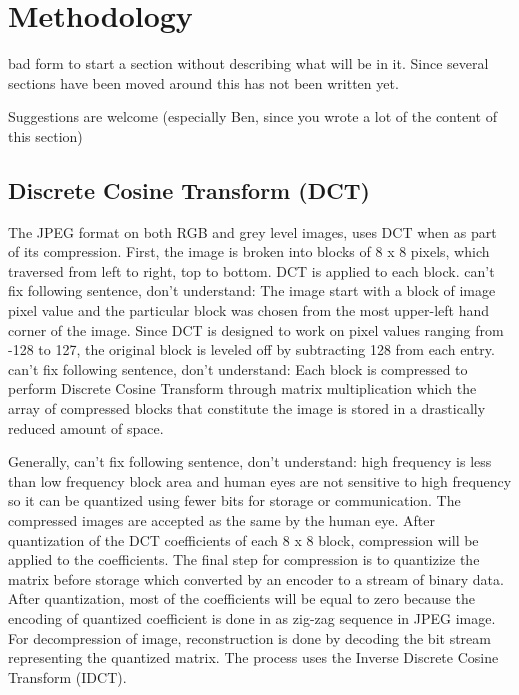 \section{Methodology}

{\color{red} bad form to start a section without describing what will be in it. Since several sections have been moved around this has not been written yet. 

Suggestions are welcome (especially Ben, since you wrote a lot of the content of this section)}

\subsection{Discrete Cosine Transform (DCT)}

The JPEG format on both RGB and grey level images, uses DCT when as part of its compression. 
First, the image is broken into blocks of 8 x 8 pixels, which traversed from left to right, top to bottom. DCT is applied to each block. 
{\color{red} can't fix following sentence, don't understand:} {\color{blue}The image start with a block of image pixel value and the particular block was chosen from the most upper-left hand corner of the image.}
Since DCT is designed to work on pixel values ranging from -128 to 127, the original block
is leveled off by subtracting 128 from each entry. 
{\color{red} can't fix following sentence, don't understand:} {\color{blue}Each block is compressed to perform Discrete Cosine Transform through matrix multiplication which the array of compressed blocks that constitute the image is stored in a drastically reduced amount of space.}

Generally, {\color{red} can't fix following sentence, don't understand:} {\color{blue}high frequency is less than low frequency block area} and human eyes are not sensitive to high frequency so it can be quantized using fewer bits for storage or communication.
The compressed images are accepted as the same by the human eye. 
After quantization of the DCT coefficients of each 8 x 8 block, compression will be applied to the coefficients.
The final step for compression is to quantizize the matrix before storage which converted by an encoder to a stream of binary data. 
After quantization, most of the coefficients will be equal to zero because the encoding  of quantized coefficient is done in as zig-zag sequence in JPEG image. 
For decompression of image, reconstruction is done by decoding the bit stream representing the quantized matrix. The process uses the Inverse Discrete Cosine Transform (IDCT).


